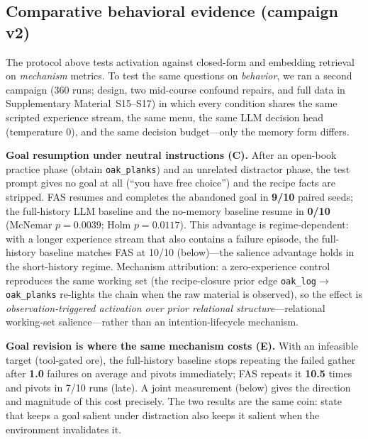 \documentclass[10pt,a4paper]{article}
\begin{document}

\subsection{Comparative behavioral evidence (campaign v2)}
\label{sec:res-campaign}

The protocol above tests activation against closed-form and embedding
retrieval on \emph{mechanism} metrics. To test the same questions on
\emph{behavior}, we ran a second campaign (360 runs; design, two
mid-course confound repairs, and full data in Supplementary
Material~S15--S17) in which every condition shares the same scripted
experience stream, the same menu, the same LLM decision head
(temperature 0), and the same decision budget---only the memory form
differs.

\textbf{Goal resumption under neutral instructions (C).} After an
open-book practice phase (obtain \texttt{oak\_planks}) and an unrelated
distractor phase, the test prompt gives no goal at all
(``you have free choice'') and the recipe facts are stripped. FAS
resumes and completes the abandoned goal in \textbf{9/10} paired seeds;
the full-history LLM baseline and the no-memory baseline resume in
\textbf{0/10} (McNemar $p{=}0.0039$; Holm $p{=}0.0117$). This advantage
is regime-dependent: with a longer experience stream that also contains
a failure episode, the full-history baseline matches FAS at 10/10
(below)---the salience advantage holds in the short-history regime.
Mechanism attribution: a zero-experience control reproduces the
same working set (the recipe-closure prior edge
\texttt{oak\_log}$\rightarrow$\texttt{oak\_planks} re-lights the chain
when the raw material is observed), so the effect is
\emph{observation-triggered activation over prior relational
structure}---relational working-set salience---rather than an
intention-lifecycle mechanism.

\textbf{Goal revision is where the same mechanism costs (E).} With an
infeasible target (tool-gated ore), the full-history baseline stops
repeating the failed gather after \textbf{1.0} failures on average and
pivots immediately; FAS repeats it \textbf{10.5} times and pivots in
7/10 runs (late). A joint measurement (below) gives the direction and
magnitude of this cost precisely. The two results are the same coin: state that keeps
a goal salient under distraction also keeps it salient when the
environment invalidates it.
\end{document}
